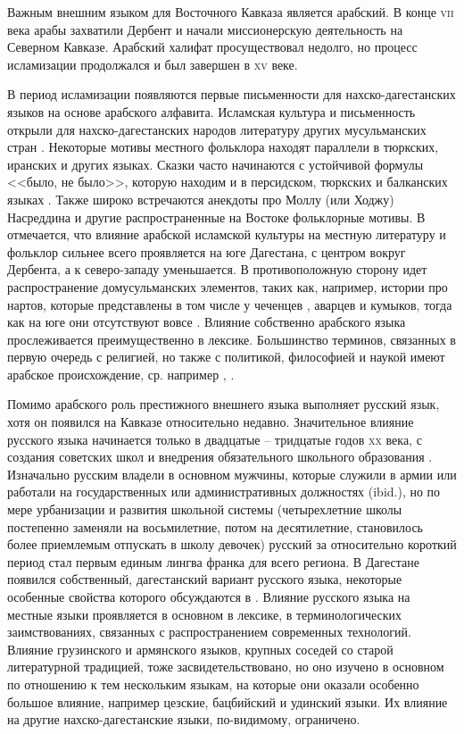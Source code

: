 Важным внешним языком для Восточного Кавказа является арабский. В конце \textsc{vii} века арабы захватили Дербент и начали миссионерскую деятельность на Северном Кавказе. Арабский халифат просуществовал недолго, но процесс исламизации продолжался и был завершен в \textsc{xv} веке. 
\par В период исламизации появляются первые письменности для нахско-дагестанских языков на основе арабского алфавита. Исламская культура и письменность открыли для нахско-дагестанских народов литературу других мусульманских стран \citep[150]{magomedova2017}. Некоторые мотивы местного фольклора находят параллели в тюркских, иранских и других языках. Сказки часто начинаются с устойчивой формулы <<было, не было>>, которую находим и в персидском, тюркских и балканских языках \citep[355--356]{friedman2000}. 
Также широко встречаются анекдоты про Моллу (или Ходжу) Насреддина и другие распространенные на Востоке фольклорные мотивы. В \citep{adzhiev1991intro} отмечается, что влияние арабской исламской культуры на местную литературу и фольклор сильнее всего проявляется на юге Дагестана, с центром вокруг Дербента, а к северо-западу уменьшается. В противоположную сторону идет распространение домусульманских элементов, таких как, например, истории про нартов, которые представлены в том числе у чеченцев \citep[213--215]{jaimoukha2005}, аварцев и кумыков, тогда как на юге они отсутствуют вовсе \citep[19]{adzhiev1991epos}. Влияние собственно арабского языка прослеживается преимущественно в лексике. Большинство терминов, связанных в первую очередь с религией, но также с политикой, философией и наукой имеют арабское происхождение, ср. например \citep{chumakina2009}, \citep{comriekhalilov2009}.
\par Помимо арабского роль престижного внешнего языка выполняет русский язык, хотя он появился на Кавказе относительно недавно. Значительное влияние русского языка начинается только в двадцатые -- тридцатые годов \textsc{xx} века, с создания советских школ и внедрения обязательного школьного образования \citep{dobrushina2019}. Изначально русским владели в основном мужчины, которые служили в армии или работали на государственных или административных должностях (ibid.), но по мере урбанизации и развития школьной системы (четырехлетние школы постепенно заменяли на восьмилетние, потом на десятилетние, становилось более приемлемым отпускать в школу девочек) русский за относительно короткий период стал первым единым лингва франка для всего региона. В Дагестане появился собственный, дагестанский вариант русского языка, некоторые особенные свойства которого обсуждаются в \citep{danieletal2010}. Влияние русского языка на местные языки проявляется в основном в лексике, в терминологических заимствованиях, связанных с распространением современных технологий. Влияние грузинского и армянского языков, крупных соседей со старой литературной традицией, тоже засвидетельствовано, но оно изучено в основном по отношению к тем нескольким языкам, на которые они оказали особенно большое влияние, например цезские, бацбийский и удинский языки. Их влияние на другие нахско-дагестанские языки, по-видимому, ограничено.
